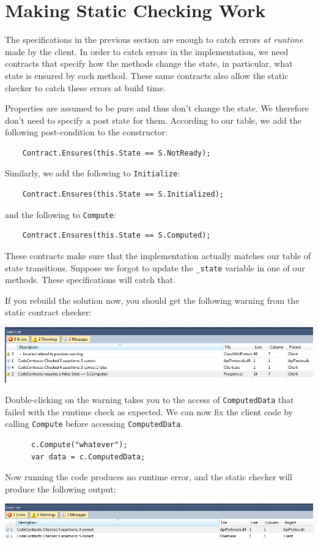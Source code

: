 \documentclass{article}
\newcommand{\code}[1]{\lstinline{#1}}
\begin{document}
\section{Making Static Checking Work}
The specifications in the previous section are enough to catch errors
\emph{at runtime} made by the client. In order to catch errors in the
implementation, we
need contracts that specify how the methods change the state, in
particular, what state is ensured by each method. These
same contracts also allow the static checker to catch these errors at
build time.

Properties are assumed to be pure and thus don't change the state. We
therefore don't need to specify a post state for them. According to
our table, we add the following post-condition to the constructor:
\begin{lstlisting}
    Contract.Ensures(this.State == S.NotReady);
\end{lstlisting}
Similarly, we add the following to \code{Initialize}:
\begin{lstlisting}
    Contract.Ensures(this.State == S.Initialized);
\end{lstlisting}
and the following to \code{Compute}:
\begin{lstlisting}
    Contract.Ensures(this.State == S.Computed);
\end{lstlisting}
These contracts make sure that the implementation actually matches our
table of state transitions. Suppose we forgot to update the
\code{_state} variable in one of our methods. These specifications
will catch that.

If you rebuild the solution now, you should get the following warning
from the static contract checker:
\begin{center}
  \includegraphics[width=1\columnwidth]{errors2.png}
\end{center}
Double-clicking on the warning takes you to the access of
\code{ComputedData} that failed with the runtime check as expected. We
can now fix the client code by calling \code{Compute} before accessing
\code{ComputedData}.
\begin{lstlisting}
      c.Compute("whatever");
      var data = c.ComputedData;
\end{lstlisting}
Now running the code produces no runtime error, and the static checker
will produce the following output:
\begin{center}
  \includegraphics[width=1\columnwidth]{errors3.png}
\end{center}
\end{document}
